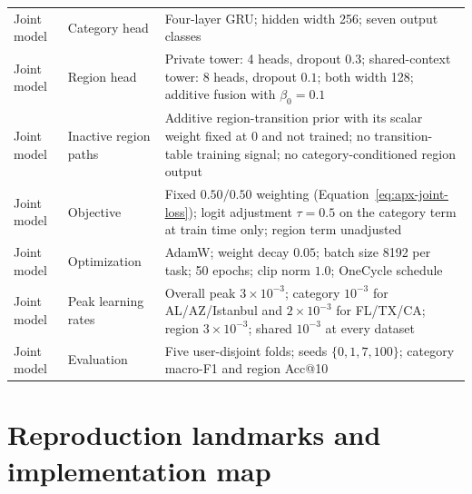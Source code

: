 {\begin{longtable}{>{\raggedright\arraybackslash}p{}
                  >{\raggedright\arraybackslash}p{}
                  >{\raggedright\arraybackslash}p{}}
Joint model & Category head & Four-layer GRU; hidden width 256; seven output classes \\
Joint model & Region head & Private tower: 4 heads, dropout $0.3$; shared-context tower: 8 heads, dropout $0.1$; both width 128; additive fusion with $\beta_0=0.1$ \\
Joint model & Inactive region paths & Additive region-transition prior with its scalar weight fixed at 0 and not trained; no transition-table training signal; no category-conditioned region output \\
Joint model & Objective & Fixed $0.50/0.50$ weighting (Equation~\ref{eq:apx-joint-loss}); logit adjustment $\tau=0.5$ on the category term at train time only; region term unadjusted \\
Joint model & Optimization & AdamW; weight decay $0.05$; batch size 8192 per task; 50 epochs; clip norm $1.0$; OneCycle schedule \\
Joint model & Peak learning rates & Overall peak $3\times10^{-3}$; category $10^{-3}$ for AL/AZ/Istanbul and $2\times10^{-3}$ for FL/TX/CA; region $3\times10^{-3}$; shared $10^{-3}$ at every dataset \\
Joint model & Evaluation & Five user-disjoint folds; seeds $\{0,1,7,100\}$; category macro-F1 and region Acc@10 \\
\bottomrule
\end{longtable}
}

\section{Reproduction landmarks and implementation map}
\label{sec:apx-methods-reproduction}

